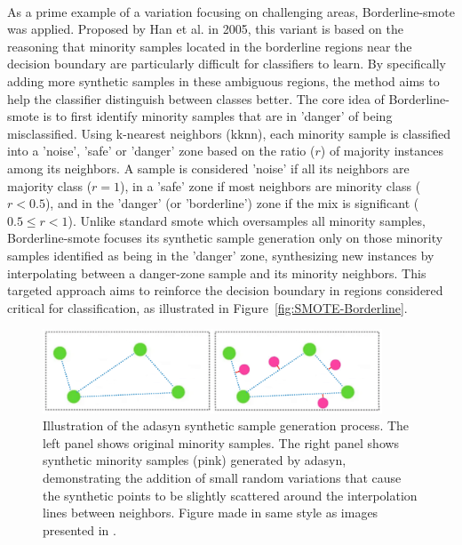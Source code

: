 \documentclass[12pt,a4paper]{report}
\begin{document}
\\
\noindent
As a prime example of a variation focusing on challenging areas, Borderline-\gls{smote} \cite{Han2005Borderline} was applied. Proposed by Han et al. in 2005, this variant is based on the reasoning that minority samples located in the borderline regions near the decision boundary are particularly difficult for classifiers to learn. By specifically adding more synthetic samples in these ambiguous regions, the method aims to help the classifier distinguish between classes better. The core idea of Borderline-\gls{smote} is to first identify minority samples that are in 'danger' of being misclassified. Using k-nearest neighbors (\acrshort{kknn}), each minority sample is classified into a 'noise', 'safe' or 'danger' zone based on the ratio ($r$) of majority instances among its neighbors. A sample is considered 'noise' if all its neighbors are majority class ($r=1$), in a 'safe' zone if most neighbors are minority class ($r < 0.5$), and in the 'danger' (or 'borderline') zone if the mix is significant ($0.5 \leq r < 1$). Unlike standard \gls{smote} which oversamples all minority samples, Borderline-\gls{smote} focuses its synthetic sample generation only on those minority samples identified as being in the 'danger' zone, synthesizing new instances by interpolating between a danger-zone sample and its minority neighbors. This targeted approach aims to reinforce the decision boundary in regions considered critical for classification, as illustrated in Figure~\ref{fig:SMOTE-Borderline}.\\
\begin{figure}[h!]
  \centering  
  \includegraphics[width=0.9\textwidth]{images/SMOTE-ADASYN.png}
  \caption[Illustration of \acrshort{adasyn} Sample Generation]{Illustration of the \acrshort{adasyn} synthetic sample generation process. The left panel shows original minority samples. The right panel shows synthetic minority samples (pink) generated by \acrshort{adasyn}, demonstrating the addition of small random variations that cause the synthetic points to be slightly scattered around the interpolation lines between neighbors. Figure made in same style as images presented in \cite{Truong2022SMOTEVariants}.}
  \label{fig:SMOTE-ADASYN}
\end{figure}
\end{document}

